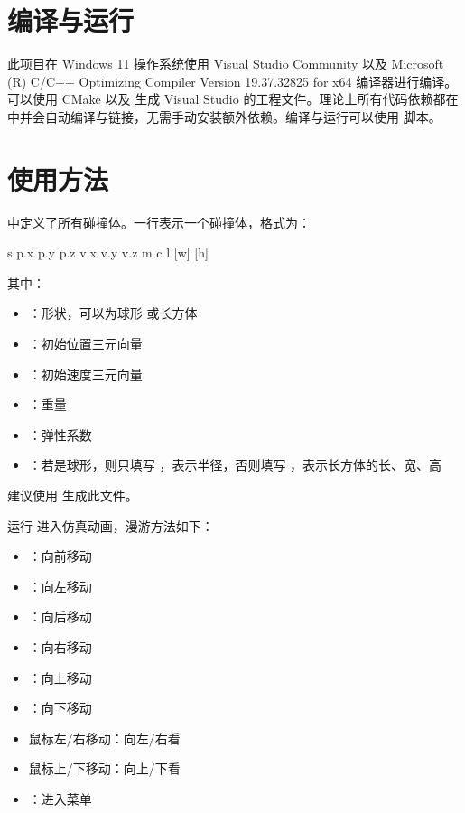 


\section{编译与运行}

此项目在 Windows 11 操作系统使用 Visual Studio Community 以及 Microsoft (R) C/C++ Optimizing Compiler Version 19.37.32825 for x64 编译器进行编译。可以使用 CMake 以及  生成 Visual Studio 的工程文件。理论上所有代码依赖都在  中并会自动编译与链接，无需手动安装额外依赖。编译与运行可以使用  脚本。

\section{使用方法}

 中定义了所有碰撞体。一行表示一个碰撞体，格式为：

\begin{codeblock}
s p.x p.y p.z v.x v.y v.z m c l [w] [h]
\end{codeblock}

其中：

\begin{itemize}
    \item {}：形状，可以为球形  或长方体 
    \item {}：初始位置三元向量
    \item {}：初始速度三元向量
    \item {}：重量
    \item {}：弹性系数
    \item {}：若是球形，则只填写 ，表示半径，否则填写 ，表示长方体的长、宽、高
\end{itemize}

建议使用  生成此文件。

运行  进入仿真动画，漫游方法如下：

\begin{multicols}{2}

\begin{itemize}
    \item {}：向前移动
    \item {}：向左移动
    \item {}：向后移动
    \item {}：向右移动
    \columnbreak
    \item \keys{\SPACE}：向上移动
    \item \keys{\shift}：向下移动
    \item 鼠标左/右移动：向左/右看
    \item 鼠标上/下移动：向上/下看
    \item {}：进入菜单
\end{itemize}

\end{multicols}

